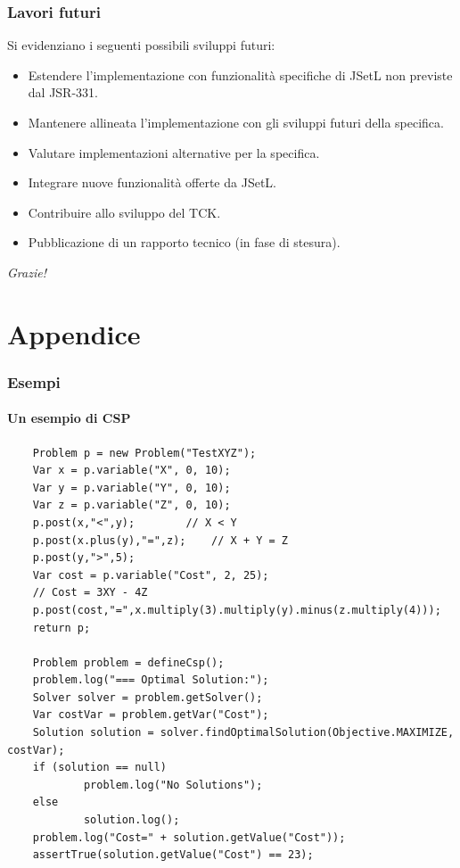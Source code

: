 \documentclass{beamer}
\begin{document}
\begin{frame}
\frametitle{Lavori futuri}
Si evidenziano i seguenti possibili sviluppi futuri:
\pause
\begin{itemize}%
\item Estendere l'implementazione con funzionalità specifiche di JSetL non
previste dal JSR-331.
\item Mantenere allineata l'implementazione con gli sviluppi futuri della
specifica.
\item Valutare implementazioni alternative per la specifica.
\item Integrare nuove funzionalità offerte da JSetL.
\item Contribuire allo sviluppo del TCK.
\item Pubblicazione di un rapporto tecnico (in fase di stesura).
\end{itemize}
\pause
\begin{flushright}
\rm \LARGE \textit{Grazie!}
\end{flushright}
\end{frame}




\section{Appendice}

\begin{frame}[fragile]
\frametitle{Esempi}
\framesubtitle{Un esempio di CSP}
\begin{lstlisting}
    Problem p = new Problem("TestXYZ");
    Var x = p.variable("X", 0, 10);
    Var y = p.variable("Y", 0, 10);
    Var z = p.variable("Z", 0, 10);
    p.post(x,"<",y); 		// X < Y
    p.post(x.plus(y),"=",z); 	// X + Y = Z
    p.post(y,">",5);
    Var cost = p.variable("Cost", 2, 25);
    // Cost = 3XY - 4Z
    p.post(cost,"=",x.multiply(3).multiply(y).minus(z.multiply(4)));
    return p;

    Problem problem = defineCsp();
    problem.log("=== Optimal Solution:");
    Solver solver = problem.getSolver();
    Var costVar = problem.getVar("Cost");
    Solution solution = solver.findOptimalSolution(Objective.MAXIMIZE, costVar);
    if (solution == null)
            problem.log("No Solutions");
    else
            solution.log();
    problem.log("Cost=" + solution.getValue("Cost"));
    assertTrue(solution.getValue("Cost") == 23);
\end{lstlisting}
\end{frame}
\end{document}
